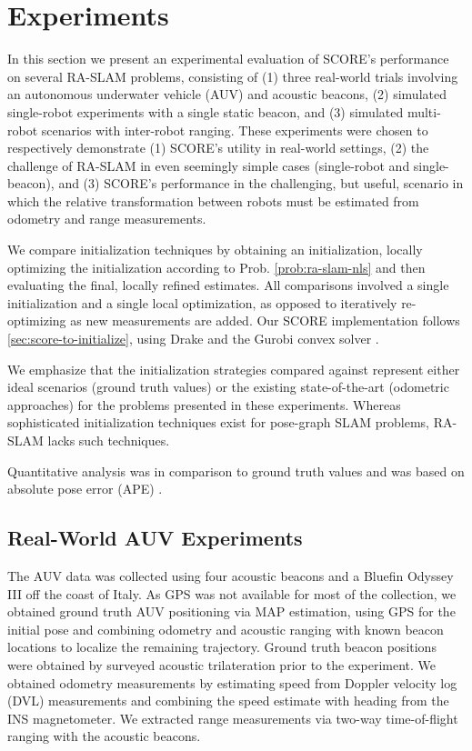 \section{Experiments}
\label{sec:experiments}

In this section we present an experimental evaluation of SCORE's performance on
several RA-SLAM problems, consisting of (1) three real-world trials
involving an autonomous underwater vehicle (AUV) and acoustic beacons, (2)
simulated single-robot experiments with a single static beacon, and (3)
simulated multi-robot scenarios with inter-robot ranging. These experiments were
chosen to
respectively demonstrate (1)
SCORE's utility in real-world settings, (2) the challenge of RA-SLAM in even
seemingly simple cases (single-robot and single-beacon), and (3) SCORE's
performance in the challenging, but useful, scenario in which the relative
transformation between robots must be estimated from odometry and range
measurements.

We compare initialization techniques by obtaining an initialization, locally
optimizing the initialization according to Prob. \ref{prob:ra-slam-nls} and
then evaluating the final, locally refined estimates. All comparisons involved a
single initialization and a single local optimization, as opposed to iteratively
re-optimizing as new measurements are added.
Our SCORE implementation
follows \cref{sec:score-to-initialize}, using Drake \cite{drake}
and the Gurobi convex solver \cite{gurobi}.

We emphasize that the initialization strategies compared against represent
either ideal scenarios (ground truth values) or the existing
state-of-the-art (odometric approaches) for the problems presented in these
experiments. Whereas sophisticated initialization techniques exist for
pose-graph SLAM problems, RA-SLAM lacks such techniques.

Quantitative analysis was in comparison to ground truth values and was based on
absolute pose error (APE) \cite{grupp2017evo}.

\subsection{Real-World AUV Experiments}

The AUV data was collected using four acoustic beacons and a Bluefin Odyssey III
off the coast of Italy.  As GPS was not available for most of the collection, we
obtained ground truth AUV positioning via MAP estimation, using GPS for the
initial pose and combining odometry and acoustic ranging with known beacon
locations to localize the remaining trajectory. Ground truth beacon positions
were obtained by surveyed acoustic trilateration prior to the experiment. We
obtained odometry measurements by estimating speed from Doppler velocity log
(DVL) measurements and combining the speed estimate with heading from the INS
magnetometer. We extracted range measurements via two-way time-of-flight ranging
with the acoustic beacons.

